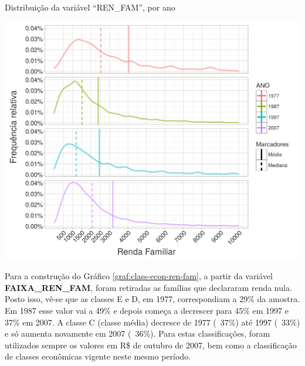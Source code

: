 \begin{grafico}[htb]%
    \caption{\label{graf:freq-rel-ren-fam}Distribuição da variável ``REN_FAM'', por ano}%
    \begin{center}%
        \includegraphics[width=1\textwidth]{./imagens/freq-rel-ren-fam.png}%
    \end{center}%
\end{grafico}%

\clearpage
Para a construção do Gráfico \ref{graf:class-econ-ren-fam}, a partir da variável \textbf{FAIXA_REN_FAM}, foram retiradas as famílias que declararam renda nula. Posto isso, vê-se que as classes E e D, em 1977, correspondiam a 29\% da amostra. Em 1987 esse valor vai a 49\% e depois começa a decrescer para 45\% em 1997 e 37\% em 2007. A classe C (classe média) decresce de 1977 (~37\%) até 1997 (~33\%) e só aumenta novamente em 2007 (~36\%). Para estas classificações, foram utilizados sempre os valores em R\$ de outubro de 2007, bem como a classificação de classes econômicas vigente neste mesmo período.

